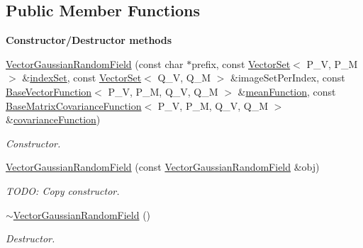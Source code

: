 \subsection*{Public Member Functions}
\begin{Indent}{\bf Constructor/\-Destructor methods}\par
\begin{DoxyCompactItemize}
\item 
\hyperlink{class_q_u_e_s_o_1_1_vector_gaussian_random_field_aeae7dcb40edbc2458f8692374de55a5f}{Vector\-Gaussian\-Random\-Field} (const char $\ast$prefix, const \hyperlink{class_q_u_e_s_o_1_1_vector_set}{Vector\-Set}$<$ P\-\_\-\-V, P\-\_\-\-M $>$ \&\hyperlink{class_q_u_e_s_o_1_1_vector_gaussian_random_field_a091d86faba76ed1bff60c8157a7743db}{index\-Set}, const \hyperlink{class_q_u_e_s_o_1_1_vector_set}{Vector\-Set}$<$ Q\-\_\-\-V, Q\-\_\-\-M $>$ \&image\-Set\-Per\-Index, const \hyperlink{class_q_u_e_s_o_1_1_base_vector_function}{Base\-Vector\-Function}$<$ P\-\_\-\-V, P\-\_\-\-M, Q\-\_\-\-V, Q\-\_\-\-M $>$ \&\hyperlink{class_q_u_e_s_o_1_1_vector_gaussian_random_field_ad14336d5026583fcc31662d1790e8cf2}{mean\-Function}, const \hyperlink{class_q_u_e_s_o_1_1_base_matrix_covariance_function}{Base\-Matrix\-Covariance\-Function}$<$ P\-\_\-\-V, P\-\_\-\-M, Q\-\_\-\-V, Q\-\_\-\-M $>$ \&\hyperlink{class_q_u_e_s_o_1_1_vector_gaussian_random_field_a5c68f05266b73ad99cc52748b99febe2}{covariance\-Function})
\begin{DoxyCompactList}\small\item\em Constructor. \end{DoxyCompactList}\item 
\hyperlink{class_q_u_e_s_o_1_1_vector_gaussian_random_field_adb2728a7cb86783378103b82c4926eb5}{Vector\-Gaussian\-Random\-Field} (const \hyperlink{class_q_u_e_s_o_1_1_vector_gaussian_random_field}{Vector\-Gaussian\-Random\-Field} \&obj)
\begin{DoxyCompactList}\small\item\em T\-O\-D\-O\-: Copy constructor. \end{DoxyCompactList}\item 
\hyperlink{class_q_u_e_s_o_1_1_vector_gaussian_random_field_a8f29ed36b35f7c2b15866c0bf1fd9c79}{$\sim$\-Vector\-Gaussian\-Random\-Field} ()
\begin{DoxyCompactList}\small\item\em Destructor. \end{DoxyCompactList}\end{DoxyCompactItemize}
\end{Indent}
